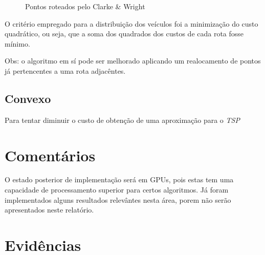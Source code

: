 \documentclass[a4paper, 12pt]{article}
\begin{document}
\begin{figure}[!ht]
\centering
{}
\caption{Pontos roteados pelo Clarke \& Wright}
\label{roteado}
\end{figure}


	O critério empregado para a distribuição dos veículos foi a minimização do
custo quadrático, ou seja, que a soma dos quadrados dos custos de cada rota
fosse mínimo. 

Obs: o algoritmo em sí pode ser melhorado aplicando um realocamento de pontos já
pertencentes a uma rota adjacêntes.


\subsection{Convexo}

	Para tentar diminuir o custo de obtenção de uma aproximação para o
\emph{TSP}

\section{Comentários}

	O estado posterior de implementação será em GPUs, pois estas tem uma
capacidade de processamento superior para certos algoritmos. Já foram
implementados alguns resultados relevântes nesta área, porem não serão
apresentados neste relatório.


\section{Evidências}

\end{document}
